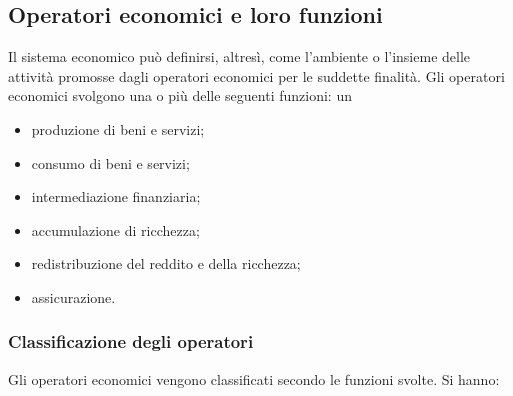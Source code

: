 \subsection{Operatori economici e loro funzioni}


Il sistema economico può definirsi, altresì, come l'ambiente o l'insieme delle 
attività promosse dagli operatori economici per le suddette finalità. Gli 
operatori economici svolgono una o più delle seguenti funzioni:
un 

\begin{itemize} [noitemsep]
\item produzione di beni e servizi;
\item consumo di beni e servizi;
\item intermediazione finanziaria;
\item accumulazione di ricchezza;
\item redistribuzione del reddito e della ricchezza;
\item assicurazione.
\end{itemize}

\subsubsection{Classificazione degli operatori}
Gli operatori economici vengono classificati secondo le funzioni svolte. Si 
hanno:

